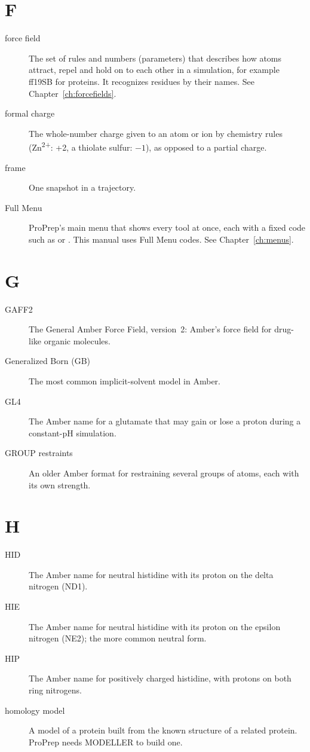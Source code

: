 \section*{F}

\begin{description}
\item[force field] The set of rules and numbers (parameters) that describes
  how atoms attract, repel and hold on to each other in a simulation, for
  example ff19SB for proteins. It recognizes residues by their names. See
  Chapter~\ref{ch:forcefields}.
\item[formal charge] The whole-number charge given to an atom or ion by
  chemistry rules (Zn\textsuperscript{2+}: +2, a thiolate sulfur: $-1$), as
  opposed to a partial charge.
\item[frame] One snapshot in a trajectory.
\item[Full Menu] ProPrep's main menu that shows every tool at once, each with
  a fixed code such as  or . This manual uses Full Menu codes.
  See Chapter~\ref{ch:menus}.
\end{description}

\section*{G}

\begin{description}
\item[GAFF2] The General Amber Force Field, version~2: Amber's force field for
  drug-like organic molecules.
\item[Generalized Born (GB)] The most common implicit-solvent model in Amber.
\item[GL4] The Amber name for a glutamate that may gain or lose a proton
  during a constant-pH simulation.
\item[GROUP restraints] An older Amber format for restraining several groups of
  atoms, each with its own strength.
\end{description}

\section*{H}

\begin{description}
\item[HID] The Amber name for neutral histidine with its proton on the delta
  nitrogen (ND1).
\item[HIE] The Amber name for neutral histidine with its proton on the epsilon
  nitrogen (NE2); the more common neutral form.
\item[HIP] The Amber name for positively charged histidine, with protons on
  both ring nitrogens.
\item[homology model] A model of a protein built from the known structure of a
  related protein. ProPrep needs MODELLER to build one.
\end{description}

